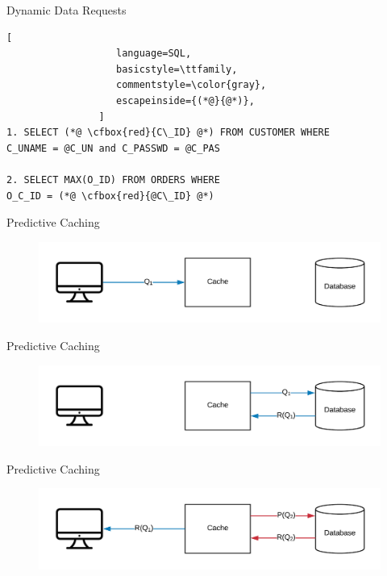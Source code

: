 \documentclass[10pt]{beamer}
\newcommand{\cfbox}[2]{%
    \colorlet{currentcolor}{.}%
    {\color{#1}%
    \fbox{\color{currentcolor}#2}}%
}
\begin{document}
\begin{frame}[fragile]{Dynamic Data Requests}
        \begin{lstlisting}[
                   language=SQL,
                   basicstyle=\ttfamily,
                   commentstyle=\color{gray},
                   escapeinside={(*@}{@*)},
                ]
1. SELECT (*@ \cfbox{red}{C\_ID} @*) FROM CUSTOMER WHERE 
C_UNAME = @C_UN and C_PASSWD = @C_PAS

2. SELECT MAX(O_ID) FROM ORDERS WHERE
O_C_ID = (*@ \cfbox{red}{@C\_ID} @*)
        \end{lstlisting}
\end{frame}

\begin{frame}{Predictive Caching}
    \begin{figure}
        \center
        \includegraphics[scale=0.17]{apollo_predictive_execution}
    \end{figure}
\end{frame}

\begin{frame}{Predictive Caching}
    \begin{figure}
        \center
        \includegraphics[scale=0.17]{apollo_predictive_execution_2}
    \end{figure}
\end{frame}

\begin{frame}{Predictive Caching}
    \begin{figure}
        \center
        \includegraphics[scale=0.17]{apollo_predictive_execution_3}
    \end{figure}
\end{frame}
\end{document}
